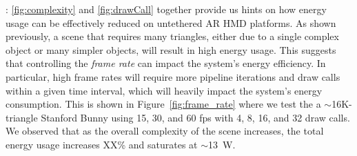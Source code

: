
:
%
\figs\ref{fig:complexity} and \ref{fig:drawCall} together provide us hints
on how energy usage can be effectively reduced on untethered AR HMD platforms.
%
%
As shown previously, a scene that requires many triangles, either due to a single complex object or many simpler objects, will result in high energy usage. This suggests that controlling the \emph{frame rate} can impact the system's energy efficiency. In particular, high frame rates will require  more pipeline iterations and draw calls within a given time interval, which will heavily impact the system's energy consumption. This is shown in Figure~\ref{fig:frame_rate} where we test the a $\sim$16K-triangle Stanford Bunny using 15, 30, and 60 fps with 4, 8, 16, and 32 draw calls. We observed that as the overall complexity of the scene increases, the total energy usage increases XX\% and saturates at $\sim$13~W.


%

